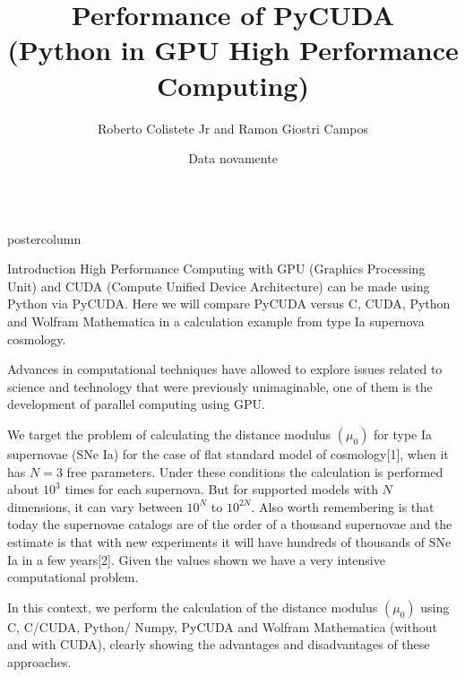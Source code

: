 \documentclass[final,hyperref={pdfpagelabels=false}]{beamer}
\title{\huge Performance of PyCUDA \\ \LARGE(Python in GPU High Performance Computing)}
\author{\textcolor{azulpastel}{Roberto Colistete Jr and Ramon Giostri Campos}}
\institute[UFES]{UFES, Brazil}
\date[Data]{Data novamente}
\newlength{\columnheight}
\begin{document}
\begin{frame}
 \vspace{.005\columnheight}
  \begin{columns}
    \begin{column}{.245\textwidth}
      \begin{beamercolorbox}[center,wd=\textwidth]{postercolumn}
        \begin{minipage}[T]{.95\textwidth}  %
          \parbox[t][\columnheight]{\textwidth}{ %
            \begin{block}{Introduction}
              High Performance Computing with GPU (Graphics Processing Unit) and CUDA (Compute Unified Device Architecture) can be made using Python via PyCUDA. Here we will compare PyCUDA versus C, CUDA, Python and Wolfram Mathematica in a calculation example from type Ia supernova cosmology.
              
              Advances in computational techniques have allowed to explore issues related to science and technology that were previously unimaginable, one of them is the development of parallel computing using GPU.
              
              We target the problem of calculating the distance modulus $(\mu_0)$ for type Ia supernovae (SNe Ia) for the case of flat standard model of cosmology[1], when it has $N=3$ free parameters. Under these conditions  the calculation is performed about $10^3$ times for each supernova. But for supported models with $N$ dimensions, it can vary between $10^N$ to $10^{2N}$. Also worth remembering is that today the supernovae catalogs are of the order of a thousand supernovae and the estimate is that with new experiments it will have hundreds of thousands of SNe Ia in a few years[2]. Given the values shown we have a very intensive computational problem.
                            
              In this context, we perform the calculation of the distance modulus $(\mu_0)$ using C, C/CUDA, Python/ Numpy, PyCUDA and Wolfram Mathematica (without and with CUDA), clearly showing the advantages and disadvantages of these approaches.
                          

\end{block}}
\end{minipage}
\end{beamercolorbox}
\end{column}
\end{columns}
\end{frame}
\end{document}
